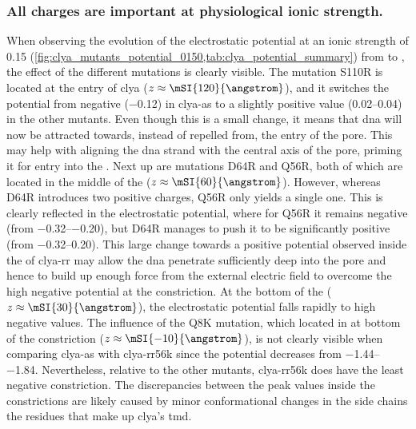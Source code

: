 \subsubsection{All charges are important at physiological ionic strength.}
%
%

When observing the evolution of the electrostatic potential at an ionic strength of \SI{0.15}{\Molar}
(\cref{fig:clya_mutants_potential_0150,tab:clya_potential_summary}) from \cisi{} to \transi{}, the effect of
the different mutations is clearly visible. The mutation S110R is located at the \cisi{} entry of \gls{clya}
($z \approx \mSI{120}{\angstrom}$), and it switches the potential from negative (\SI{-0.12}{\kTe}) in
\gls{clya-as} to a slightly positive value (\SIrange{+0.02}{0.04}{\kTe}) in the other mutants. Even though
this is a small change, it means that \gls{dna} will now be attracted towards, instead of repelled from, the
\cisi{} entry of the pore. This may help with aligning the \gls{dna} strand with the central axis of the pore,
priming it for entry into the \lumen{}. Next up are mutations D64R and Q56R, both of which are located in the
middle of the \lumen{} ($z \approx \mSI{60}{\angstrom}$). However, whereas D64R introduces two positive
charges, Q56R only yields a single one. This is clearly reflected in the electrostatic potential, where for
Q56R it remains negative (from \SIrange{-0.32}{-0.20}{\kTe}), but D64R manages to push it to be significantly
positive (from \SIrange{-0.32}{+0.20}{\kTe}). This large change towards a positive potential observed inside
the \lumen{} of \gls{clya-rr} may allow the \gls{dna} penetrate sufficiently deep into the pore and hence to
build up enough force from the external electric field to overcome the high negative potential at the
\transi{} constriction. At the bottom of the \lumen{} ($z \approx \mSI{30}{\angstrom}$), the electrostatic
potential falls rapidly to high negative values. The influence of the Q8K mutation, which located in at bottom
of the constriction ($z \approx \mSI{-10}{\angstrom}$), is not clearly visible when comparing \gls{clya-as}
with \gls{clya-rr56k} since the potential decreases from \SIrange{-1.44}{-1.84}{\kTe}. Nevertheless, relative
to the other mutants, \gls{clya-rr56k} does have the least negative constriction. The discrepancies between
the peak values inside the constrictions are likely caused by minor conformational changes in the side chains
the residues that make up \gls{clya}'s \gls{tmd}.\footnotemark%
%
